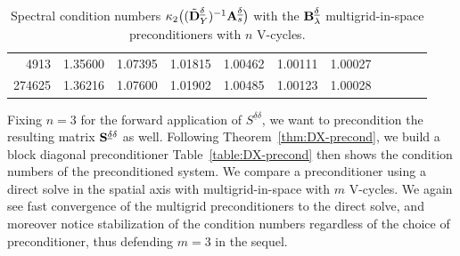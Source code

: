 \documentclass[11pt,a4paper,oneside,english]{amsart}
\numberwithin{equation}{section}
\numberwithin{theorem}{section}
\theoremstyle{definition}
\newcommand{\udelta}{{\underline{\delta}}}
\newcommand{\jw}[1]{{\color{red}{JW: #1}}}
\begin{document}
\begin{table}
\begin{tabular}{rrrrrrrrrrr}
    4913    & 1.35600    & 1.07395  & 1.01815  & 1.00462  & 1.00111  & 1.00027 \\
    274625  & 1.36216  & 1.07600    & 1.01902  & 1.00485  & 1.00123  & 1.00028
    \\\bottomrule
  \end{tabular}
  \caption{Spectral condition numbers $\kappa_2\big((\tilde {\bf D}_Y^\udelta)^{-1} {\bf A}_s^{\udelta}\big)$ with the ${\bf B}_\lambda^\udelta$ multigrid-in-space preconditioners with $n$ V-cycles.\jw{wording; ik wacht nog op numres}}
  \label{table:DY-precond}
\end{table}

Fixing $n=3$ for the forward application of $S^{\udelta \delta}$, we want to precondition
the resulting matrix ${\bf S}^{\udelta \delta}$ as well. Following Theorem~\ref{thm:DX-precond},
we build a block diagonal preconditioner
Table~\ref{table:DX-precond} then shows the condition numbers of the preconditioned
system. We compare a preconditioner using a direct solve in the spatial axis with
multigrid-in-space with $m$ V-cycles. We again see fast convergence of the multigrid
preconditioners to the direct solve, and moreover notice stabilization of the condition
numbers regardless of the choice of preconditioner, thus defending $m=3$ in the sequel.
\end{document}
